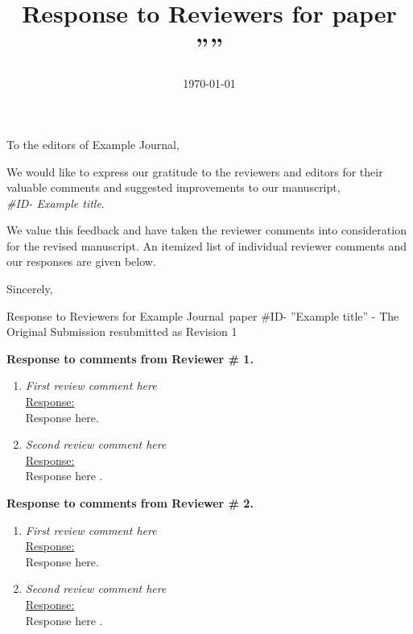 \documentclass[english]{ethbrief3}
\date{\today}
\title{\vspace{-10mm}Response to Reviewers for \journalTitle paper \articleAbbr  ''\articleTitle''  }
\newcommand{\articleTitle}{Example title}
\newcommand{\articleAbbr}{\#ID}
\newcommand{\journalTitle}{Example Journal}
\newcommand{\comment}[1]{ { \it #1 \\[5pt]} }
\newcommand{\response}[1]{ { \underline{Response:}\\#1} }
\begin{document}
\begin{letter}{}

\opening{To the editors of \journalTitle,}

We would like to express our gratitude to the reviewers and editors for their valuable comments and suggested improvements to our manuscript, \\{\it \articleAbbr - \articleTitle}. 

We value this feedback and have taken the reviewer comments into consideration for the revised manuscript. An itemized list of individual reviewer comments and our responses are given below.

\closing{Sincerely,}\end{letter}

\newpage
{\Large Response to Reviewers for \journalTitle ~paper \articleAbbr - ''\articleTitle'' - The Original Submission resubmitted as Revision 1}
\vspace{1cm}


{\bf Response to comments from Reviewer \# 1.}

\begin{enumerate}
\item \comment{First review comment here}
\response{Response here.}

\item \comment{Second review comment here}
\response{Response here \cite{biela_2009,kim_2011}.}

\end{enumerate}


{\bf Response to comments from Reviewer \# 2.}

\begin{enumerate}
\item \comment{First review comment here}
\response{Response here.}

\item \comment{Second review comment here}
\response{Response here \cite{kim_2011}.}

\end{enumerate}


\printbibliography
\end{document}
